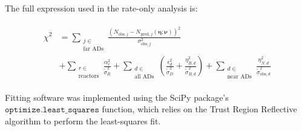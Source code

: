 The full \chisquare{} expression used in the rate-only analysis is:

\begin{align}
    \begin{split}
        \chi^2 &= \sum_{\substack{j \in \\\text{far ADs}}}
            \frac{
                (N_{\text{obs},j}
                - N_{\text{pred},j}(\boldsymbol{\eta};\boldsymbol{\nu}))^2}
            {\sigma_{\text{obs},j}^2 } \\
            &+ \sum_{\substack{r \in \\\text{reactors}}}
                \frac{\alpha_r^2}{\tilde{\sigma}_R^2}
            + \sum_{\substack{d \in \\\text{all ADs}}}
            \left(
                \frac{\epsilon_d^2}{\tilde{\sigma}_D^2}
                + \frac{\eta_{B,d}^2}{\tilde{\sigma}_{B,d}^2}
            \right)
            + \sum_{\substack{d \in \\\text{near ADs}}}
            \frac{\eta_{N,d}^2}{\tilde{\sigma}^2_{\text{obs},d}}
    \end{split}
\end{align}

Fitting software was implemented using the SciPy package's
$\mathtt{optimize.least\_squares}$ function,
which relies on the Trust Region Reflective algorithm 
to perform the least-squares fit.







